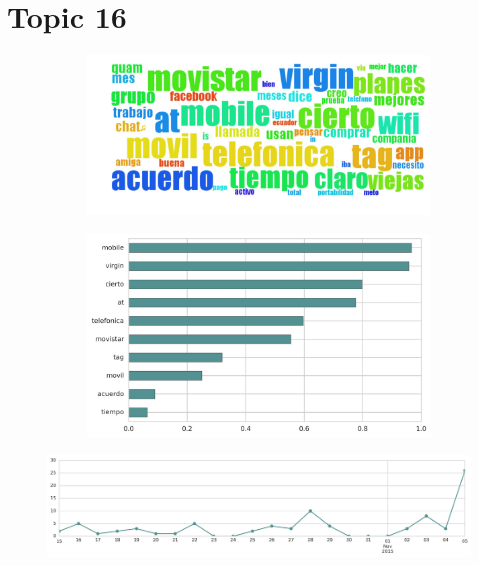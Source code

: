 \begin{longtable}{p{12.5cm}rr}
\end{longtable}
\clearpage

\section{Topic 16}

\begin{figure}[htbp!]
    \centering
    \begin{subfigure}[b]{0.49\textwidth}
        \includegraphics[width=\textwidth]{twitter_all/report_images/topic-16-wordcloud.jpg}
    \end{subfigure}
    \begin{subfigure}[b]{0.49\textwidth}
        \includegraphics[width=\textwidth]{twitter_all/report_images/topic-16-terms.jpg}
    \end{subfigure}
\end{figure}

\begin{figure}[htbp!]
    \centering
    \includegraphics[width=\textwidth]{twitter_all/report_images/topic-16-timeseries.jpg}
\end{figure}

